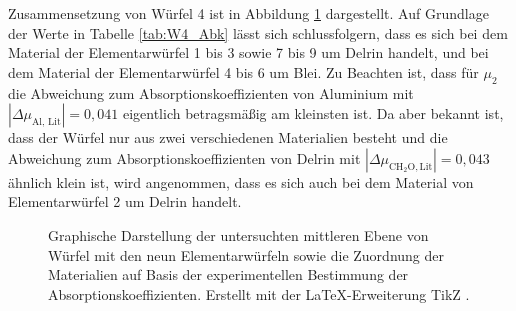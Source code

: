 Zusammensetzung von Würfel 4 ist in Abbildung \ref{fig:tikz2} dargestellt. Auf Grundlage der Werte in Tabelle \ref{tab:W4_Abk} 
lässt sich schlussfolgern, dass es sich bei dem Material der Elementarwürfel 1 bis 3 sowie 7 bis 9 um Delrin handelt, und bei dem 
Material der Elementarwürfel 4 bis 6 um Blei. 
Zu Beachten ist, dass für $\mu_2$ die Abweichung zum Absorptionskoeffizienten
von Aluminium mit $|\Delta {\mu_\text{Al, Lit}}| = 0,041$ eigentlich betragsmäßig am kleinsten ist. Da aber bekannt ist, dass der Würfel nur aus zwei verschiedenen Materialien besteht
und die Abweichung zum Absorptionskoeffizienten von Delrin mit $|\Delta {\mu_{\text{CH}_2\text{O}, \text{Lit}}}| = 0,043$ ähnlich klein ist, wird
angenommen, dass es sich auch bei dem Material von Elementarwürfel 2 um Delrin handelt. 
\begin{figure}
    \centering
    \caption{Graphische Darstellung der untersuchten mittleren Ebene von Würfel mit den neun Elementarwürfeln sowie die Zuordnung 
    der Materialien auf Basis der experimentellen Bestimmung der Absorptionskoeffizienten. 
    Erstellt mit der \LaTeX-Erweiterung TikZ \cite{tantau:2013a}.}
    \label{fig:tikz2}
\end{figure}
